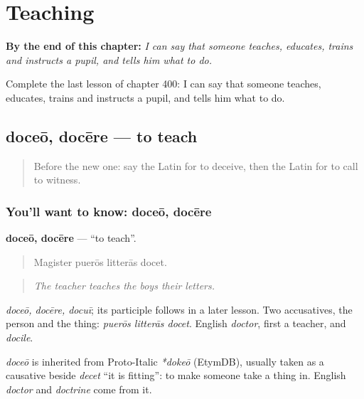 
\chapter{Teaching}
\label{ch:la-teaching}

\begin{chapteropening}
\textbf{By the end of this chapter:} \emph{I can say that someone teaches, educates, trains and instructs a pupil, and tells him what to do.}

Complete the last lesson of chapter 400: I can say that someone teaches, educates, trains and instructs a pupil, and tells him what to do.
\end{chapteropening}

\section[doceō, docēre]{doceō, docēre — to teach}

\label{lesson:LA-C400-doceo}



\begin{quote}
Before the new one: say the Latin for to deceive, then the Latin for to call to witness.
\end{quote}

\subsection*{You'll want to know: doceō, docēre}
\textbf{doceō, docēre} — \textquotedblleft{}to teach\textquotedblright{}.

\begin{quote}
Magister puerōs litterās docet.
\end{quote}

\begin{quote}
\emph{The teacher teaches the boys their letters.}
\end{quote}

\emph{doceō, docēre, docuī}; its participle follows in a later lesson. Two accusatives, the person and the thing: \emph{puerōs litterās docet}. English \emph{doctor}, first a teacher, and \emph{docile}.

\begin{cousinweb}
\emph{doceō} is inherited from Proto-Italic \emph{*dokeō} (EtymDB), usually taken as a causative beside \emph{decet} \textquotedblleft{}it is fitting\textquotedblright{}: to make someone take a thing in. English \emph{doctor} and \emph{doctrine} come from it.
\end{cousinweb}

